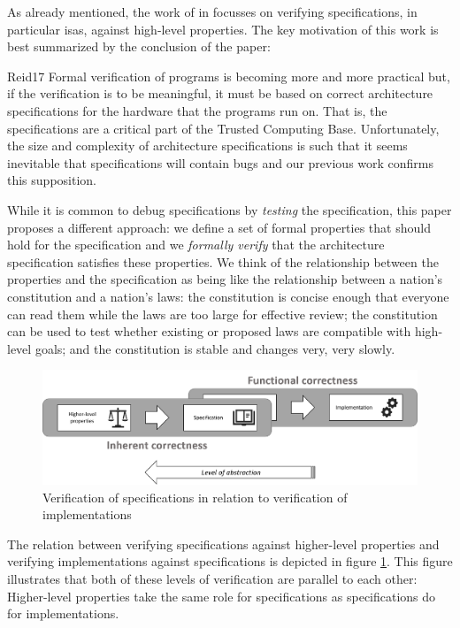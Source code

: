 As already mentioned, the work of \citeauthor{Reid17} in  \cite{Reid17} focusses on verifying specifications, in particular \glspl{isa}, against high-level properties.
The key motivation of this work is best summarized by the conclusion of the paper:

\begin{displaycquote}[p.88:22]{Reid17}
    Formal verification of programs is becoming more and more practical but, if the verification is to be meaningful, it must be based on correct architecture specifications for the hardware that the programs run on.
    That is, the specifications are a critical part of the Trusted Computing Base.
    Unfortunately, the size and complexity of architecture specifications is such that it seems inevitable that specifications will contain bugs and our previous work confirms this supposition.

    While it is common to debug specifications by \textit{testing} the specification, this paper proposes a different approach:
    we define a set of formal properties that should hold for the specification and we \textit{formally verify} that the architecture specification satisfies these properties.
    We think of the relationship between the properties and the specification as being like the relationship between a nation's constitution and a nation's laws:
    the constitution is concise enough that everyone can read them while the laws are too large for effective review; the constitution can be used to test whether existing or proposed laws are compatible with high-level goals; and the constitution is stable and changes very, very slowly.
\end{displaycquote}

\begin{figure}
    \centering
    \includegraphics[width=\textwidth]{figures/higher-level-verification.png}
    \caption{Verification of specifications in relation to verification of implementations}
    \label{fig:spec-verification}
\end{figure}

The relation between verifying specifications against higher-level properties and verifying implementations against specifications is depicted in figure \ref{fig:spec-verification}.
This figure illustrates that both of these levels of verification are parallel to each other: Higher-level properties take the same role for specifications as specifications do for implementations.

